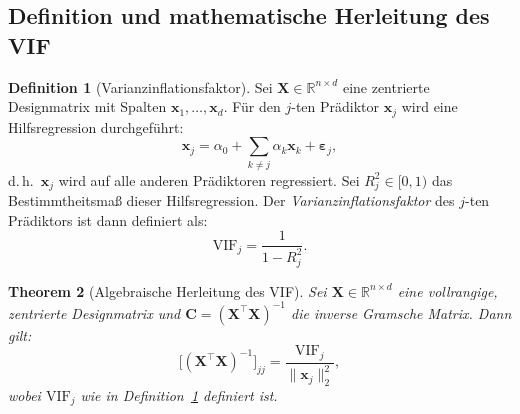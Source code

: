 ﻿\documentclass[12pt, a4paper]{article}
\newtheorem{theorem}{Theorem}[section]
\theoremstyle{definition}
\newtheorem{definition}[theorem]{Definition}
\theoremstyle{remark}
\newcommand{\R}{\mathbb{R}}
\newcommand{\vx}{\bm{x}}
\newcommand{\vX}{\bm{X}}
\newcommand{\T}{\top}
\begin{document}
\subsection{Definition und mathematische Herleitung des VIF}

\begin{definition}[Varianzinflationsfaktor]
	\label{def:vif}
	Sei $\vX \in \R^{n \times d}$ eine zentrierte Designmatrix mit Spalten $\vx_1, \ldots, \vx_d$.
	Für den $j$-ten Prädiktor $\vx_j$ wird eine Hilfsregression durchgeführt:
	\[
	\vx_j = \alpha_0 + \sum_{k \neq j} \alpha_k \vx_k + \bm{\varepsilon}_j,
	\]
	d.\,h.\ $\vx_j$ wird auf alle anderen Prädiktoren regressiert. Sei $R_j^2 \in [0,1)$ das
	Bestimmtheitsmaß dieser Hilfsregression. Der \emph{Varianzinflationsfaktor} des $j$-ten
	Prädiktors ist dann definiert als:
	\begin{equation}
		\boxed{\mathrm{VIF}_j = \frac{1}{1 - R_j^2}.}
		\label{eq:vif_def}
	\end{equation}
\end{definition}

\begin{theorem}[Algebraische Herleitung des VIF]
	\label{thm:vif_derivation}
	Sei $\vX \in \R^{n \times d}$ eine vollrangige, zentrierte Designmatrix und
	$\bm{C} = (\vX^\T\vX)^{-1}$ die inverse Gramsche Matrix. Dann gilt:
	\begin{equation}
		\bigl[(\vX^\T\vX)^{-1}\bigr]_{jj} = \frac{\mathrm{VIF}_j}{\|\vx_j\|_2^2},
		\label{eq:vif_algebraic}
	\end{equation}
	wobei $\mathrm{VIF}_j$ wie in Definition~\ref{def:vif} definiert ist.
\end{theorem}
\end{document}
